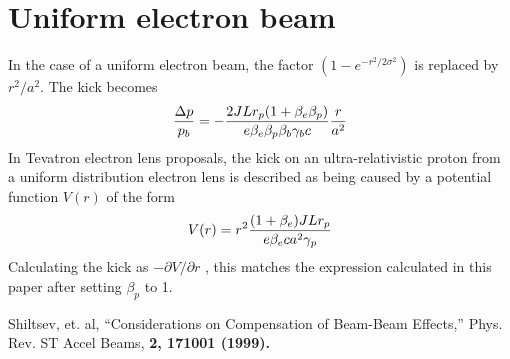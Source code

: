 \documentclass[acus]{jacow}
\begin{document}
\section{Uniform electron beam}
In the case of a uniform electron beam, the factor $( 1 - e^{-{{r^2} / {2 \sigma^2}}} )$ is replaced by
$r^2/a^2$.
The kick becomes
$$
{\Delta p \over p_b} = - {  2 J L r_p (1 + \beta_e \beta_p) \over {e \beta_e \beta_p \beta_b \gamma_b c}} {r \over a^2}
$$
In Tevatron electron lens proposals\cite{shiltsev}, the kick on an ultra-relativistic proton from a
uniform distribution electron lens is described as being caused by a
potential function $V(r)$ of the form
$$
V(r) = r^2 {{(1 + \beta_e ) J L r_p } \over {e \beta_e c a^2 \gamma_p}}
$$
Calculating the kick as $ -\partial V / \partial r $ , this matches the  expression calculated
in this paper after
setting $\beta_p$ to 1.

\begin{thebibliography}{9}   %
  Shiltsev, et. al, ``Considerations on Compensation of Beam-Beam Effects,''
  Phys. Rev. ST Accel Beams, \bf{2}, 171001 (1999).
\end{thebibliography}
\end{document}
